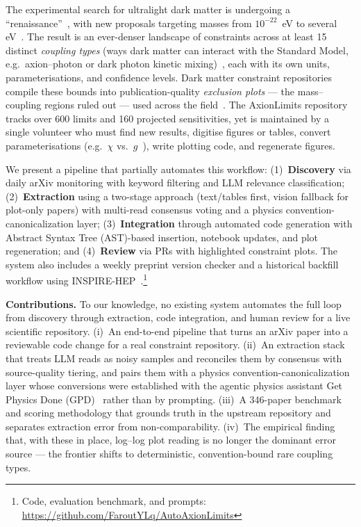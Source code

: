 \documentclass{article}
\begin{document}
The experimental search for ultralight dark matter is undergoing a ``renaissance''~\cite{snowmass_axion}, with new proposals targeting masses from $10^{-22}$~eV to several eV~\cite{irastorza_review, kim_review}. The result is an ever-denser landscape of constraints across at least 15 distinct \emph{coupling types} (ways dark matter can interact with the Standard Model, e.g.\ axion--photon or dark photon kinetic mixing)~\cite{dp_cookbook}, each with its own units, parameterisations, and confidence levels. Dark matter constraint repositories compile these bounds into publication-quality \emph{exclusion plots} --- the mass--coupling regions ruled out --- used across the field~\cite{axionlimits, dp_cookbook, ohare_review}. The AxionLimits repository~\cite{axionlimits} tracks over 600 limits and 160 projected sensitivities, yet is maintained by a single volunteer who must find new results, digitise figures or tables, convert parameterisations (e.g.\ $\chi$ vs.\ $g$~\cite{dp_cookbook}), write plotting code, and regenerate figures.

We present a pipeline that partially automates this workflow: (1)~\textbf{Discovery} via daily arXiv monitoring with keyword filtering and LLM relevance classification; (2)~\textbf{Extraction} using a two-stage approach (text/tables first, vision fallback for plot-only papers) with multi-read consensus voting and a physics convention-canonicalization layer; (3)~\textbf{Integration} through automated code generation with Abstract Syntax Tree (AST)-based insertion, notebook updates, and plot regeneration; and (4)~\textbf{Review} via PRs with highlighted constraint plots.
The system also includes a weekly preprint version checker and a historical backfill workflow using INSPIRE-HEP~\cite{inspirehep}.\footnote{Code, evaluation benchmark, and prompts: \url{https://github.com/FaroutYLq/AutoAxionLimits}}

\textbf{Contributions.}
To our knowledge, no existing system automates the full loop from discovery through extraction, code integration, and human review for a live scientific repository. (i)~An end-to-end pipeline that turns an arXiv paper into a reviewable code change for a real constraint repository. (ii)~An extraction stack that treats LLM reads as noisy samples and reconciles them by consensus with source-quality tiering, and pairs them with a physics convention-canonicalization layer whose conversions were established with the agentic physics assistant Get Physics Done (GPD)~\cite{gpd} rather than by prompting. (iii)~A 346-paper benchmark and scoring methodology that grounds truth in the upstream repository and separates extraction error from non-comparability. (iv)~The empirical finding that, with these in place, log--log plot reading is no longer the dominant error source --- the frontier shifts to deterministic, convention-bound rare coupling types.
\end{document}
